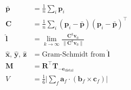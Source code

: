 \documentclass[11pt, a4paper]{article}
\begin{document}
\begin{align}
  \bar{\bm{p}}    &= \tfrac{1}{n}\textstyle\sum_i \bm{p}_i
  \tag{Centroid} \\[4pt]
  \bm{C}          &= \tfrac{1}{n}\textstyle\sum_i
    (\bm{p}_i-\bar{\bm{p}})(\bm{p}_i-\bar{\bm{p}})^\top
  \tag{Covariance} \\[4pt]
  \hat{\bm{l}}    &= \lim_{k\to\infty}
    \tfrac{\bm{C}^k\bm{v}_0}{\|\bm{C}^k\bm{v}_0\|}
  \tag{Long axis} \\[4pt]
  \hat{\bm{x}},\,\hat{\bm{y}},\,\hat{\bm{z}}
                  &= \text{Gram-Schmidt from } \hat{\bm{l}}
  \tag{Basis} \\[4pt]
  \bm{M}          &= \bm{R}^\top \bm{T}_{-\bm{e}_{\mathrm{distal}}}
  \tag{Orient transform} \\[4pt]
  V               &= \tfrac{1}{6}\bigl|\textstyle\sum_f
    \bm{a}_f\cdot(\bm{b}_f\times\bm{c}_f)\bigr|
  \tag{Volume}
\end{align}
\end{document}
